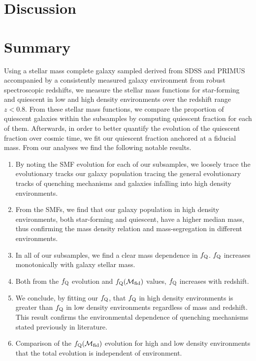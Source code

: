 \documentclass{emulateapj}
\begin{document}
\section{Discussion} \label{sec:discussion}

\section{Summary} \label{sec:summary}
Using a stellar mass complete galaxy sampled derived from SDSS and PRIMUS accompanied by a consistently measured galaxy environment from robust spectroscopic redshifts, we measure the stellar mass functions for star-forming and quiescent in low and high density environments over the redshift range $z < 0.8$. From these stellar mass functions, we compare the proportion of quiescent galaxies within the subsamples by computing quiescent fraction for each of them. Afterwards, in order to better quantify the evolution of the quiescent fraction over cosmic time, we fit our quiescent fraction anchored at a fiducial mass. From our analyses we find the following notable results. 

\begin{enumerate}
	\item By noting the SMF evolution for each of our subsamples, we loosely trace the evolutionary tracks our galaxy population tracing the general evolutionary tracks of quenching mechanisms and galaxies infalling into high density environments. 
	\item From the SMFs, we find that our galaxy population in high density environments, both star-forming and quiescent, have a higher median mass, thus confirming the mass density relation and mass-segregation in different environments.
	\item In all of our subsamples, we find a clear mass dependence in $f_{\rm{Q}}$. $f_{\rm{Q}}$ increases monotonically with galaxy stellar mass. 
	\item Both from the $f_{\rm{Q}}$ evolution and $f_{\rm{Q}}(\mathcal{M}_{\rm{fid}})$ values, $f_{\rm{Q}}$ increases with redshift. 
	\item We conclude, by fitting our $f_{\rm{Q}}$, that $f_{\rm{Q}}$ in high density environments is greater than $f_{\rm{Q}}$ in low density environments regardless of mass and redshift. This result confirms the environmental dependence of quenching mechanisms stated previously in literature. 
	\item Comparison of the $f_{\rm{Q}}(\mathcal{M}_{\rm{fid}})$ evolution for high and low density environments that the total evolution is independent of environment. 
\end{enumerate}
\end{document}
